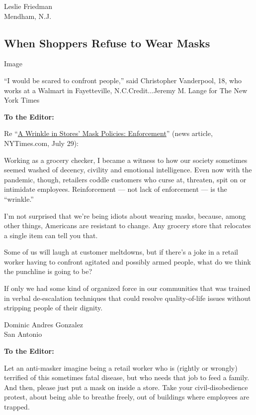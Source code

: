 Leslie Friedman\\
Mendham, N.J.

\hypertarget{when-shoppers-refuse-to-wear-masks}{%
\subsection{When Shoppers Refuse to Wear
Masks}\label{when-shoppers-refuse-to-wear-masks}}

Image

``I would be scared to confront people,'' said Christopher Vanderpool,
18, who works at a Walmart in Fayetteville, N.C.Credit...Jeremy M. Lange
for The New York Times

\textbf{To the Editor:}

Re
``\href{https://www.nytimes3xbfgragh.onion/2020/07/29/business/coronavirus-masks-stores-walmart.html?action=click\&module=Top\%20Stories\&pgtype=Homepage}{A
Wrinkle in Stores' Mask Policies: Enforcement}'' (news article,
NYTimes.com, July 29):

Working as a grocery checker, I became a witness to how our society
sometimes seemed washed of decency, civility and emotional intelligence.
Even now with the pandemic, though, retailers coddle customers who curse
at, threaten, spit on or intimidate employees. Reinforcement --- not
lack of enforcement --- is the ``wrinkle.''

I'm not surprised that we're being idiots about wearing masks, because,
among other things, Americans are resistant to change. Any grocery store
that relocates a single item can tell you that.

Some of us will laugh at customer meltdowns, but if there's a joke in a
retail worker having to confront agitated and possibly armed people,
what do we think the punchline is going to be?

If only we had some kind of organized force in our communities that was
trained in verbal de-escalation techniques that could resolve
quality-of-life issues without stripping people of their dignity.

Dominic Andres Gonzalez\\
San Antonio

\textbf{To the Editor:}

Let an anti-masker imagine being a retail worker who is (rightly or
wrongly) terrified of this sometimes fatal disease, but who needs that
job to feed a family. And then, please just put a mask on inside a
store. Take your civil-disobedience protest, about being able to breathe
freely, out of buildings where employees are trapped.

